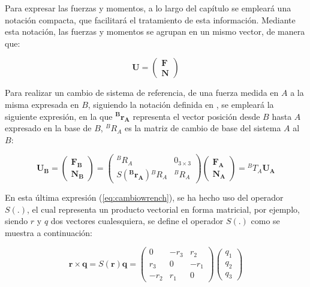 Para expresar las fuerzas y momentos, a lo largo del capítulo se empleará una notación compacta, que facilitará el tratamiento de esta información. Mediante esta notación, las fuerzas y momentos se agrupan en un mismo vector, de manera que:

\[
	\boldsymbol{U} = 
	\begin{pmatrix} 
		\boldsymbol{F} \\ \boldsymbol{N} 
	\end{pmatrix}
\] \par

Para realizar un cambio de sistema de referencia, de una fuerza medida en $A$ a la misma expresada en $B$, siguiendo la notación definida en \cite{sciavicco2000modelling}, se empleará la siguiente expresión, en la que $\boldsymbol{^Br_A}$ representa el vector posición desde $B$ hasta $A$ expresado en la base de $B$, ${^BR_A}$ es la matriz de cambio de base del sistema $A$ al $B$:

\begin{equation}
	\boldsymbol{U_B} = 
	\begin{pmatrix} 
		\boldsymbol{F_B} \\ \boldsymbol{N_B} 
	\end{pmatrix} = 
	\begin{pmatrix}
		{^BR_A} & 0_{3\times3} \\ S(\boldsymbol{^Br_A}){^BR_A} & {^BR_A}
	\end{pmatrix}
	\begin{pmatrix} 
		\boldsymbol{F_A} \\ \boldsymbol{N_A} 
	\end{pmatrix} =
	{^BT_A} \boldsymbol{U_A}
\label{eq:cambiowrench}
\end{equation} 

En esta última expresión (\ref{eq:cambiowrench}), se ha hecho uso del operador $S(.)$, el cual representa un producto vectorial en forma matricial, por ejemplo, siendo $r$ y $q$ dos vectores cualesquiera, se define el operador $S(.)$ como se muestra a continuación:

\[ 
 	\boldsymbol{r} \times \boldsymbol{q} = S(\boldsymbol{r})\boldsymbol{q} = 
  	\begin{pmatrix}
		0 & -r_3 & r_2 \\ r_3 & 0 & -r_1 \\ -r_2 & r_1 & 0
	\end{pmatrix}
	\begin{pmatrix}
		q_1 \\ q_2 \\ q_3
	\end{pmatrix}
\]

